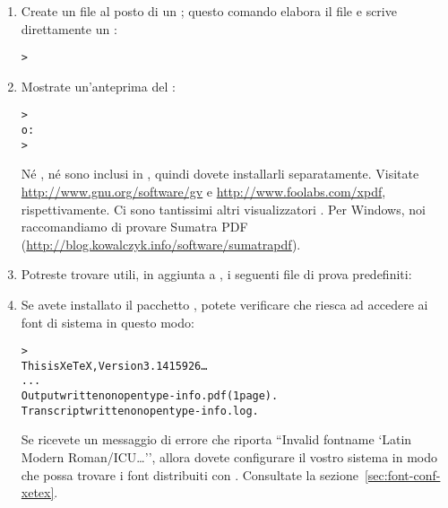 \documentclass{article}
\begin{document}
\begin{enumerate}
\item Create un file  al posto di un \dvi{}; questo comando
elabora il file  e scrive direttamente un :
\begin{alltt}
> 
\end{alltt}

\item Mostrate un'anteprima del :
\begin{alltt}
> 
\textrm{o:}
> 
\end{alltt}
Né , né  sono inclusi in \TL{}, quindi dovete
installarli separatamente. Visitate \url{http://www.gnu.org/software/gv} e
\url{http://www.foolabs.com/xpdf}, rispettivamente. Ci sono tantissimi
altri visualizzatori . Per Windows, noi raccomandiamo di provare
Sumatra PDF (\url{http://blog.kowalczyk.info/software/sumatrapdf}).

\item Potreste trovare utili, in aggiunta a , i
seguenti file di prova predefiniti:


\item Se avete installato il pacchetto , potete verificare che
riesca ad accedere ai font di sistema in questo modo:
\begin{alltt}
> 
This is XeTeX, Version 3.1415926\dots
...
Output written on opentype-info.pdf (1 page).
Transcript written on opentype-info.log.
\end{alltt}
Se ricevete un messaggio di errore che riporta ``Invalid fontname `Latin
Modern Roman/ICU\dots'', allora dovete configurare il vostro sistema in
modo che \XeTeX{} possa trovare i font distribuiti con \TL. Consultate la
sezione~\ref{sec:font-conf-xetex}.

\end{enumerate}
\end{document}
